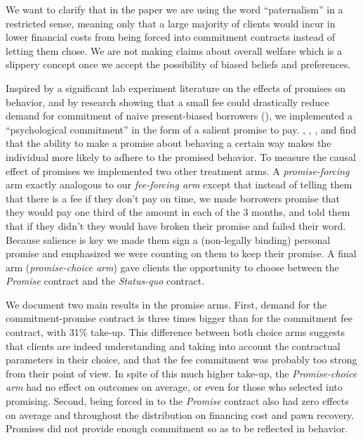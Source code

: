 \documentclass[oneside,11pt]{article}
\begin{document}
We want to clarify that in the paper we are using the word ``paternalism'' in a restricted sense, meaning only that a large majority of clients would incur in lower financial costs from being forced into commitment contracts instead of letting them chose. We are not making claims about overall welfare which is a slippery concept once we accept the possibility of biased beliefs and preferences.

Inspired by a significant lab experiment literature on the effects of promises on behavior, and by research showing that a small fee could drastically reduce demand for commitment of naive present-biased borrowers (\cite{Laibson2015}), we implemented a ``psychological commitment'' in the form of a salient promise to pay.  \cite{PromisesPartnerships}, \cite{FurtherPromises}, \cite{Vanberg}, and \cite{Ismayilov2017} find that the ability to make a promise about behaving a certain way makes the individual more likely to adhere to the promised behavior. %
To measure the causal effect of promises we implemented two other treatment arms. A \textit{promise-forcing} arm exactly analogous to our \textit{fee-forcing arm} except that instead of telling them that there is a fee if they don't pay on time, we made borrowers promise that they would pay one third of the amount in each of the 3 months, and told them that if they didn't they would have broken their promise and failed their word. Because salience is key we made them sign a (non-legally binding) personal promise and emphasized we were counting on them to keep their promise. A final arm (\textit{promise-choice arm}) gave clients the opportunity to choose between the \textit{Promise} contract and the \textit{Status-quo} contract.

We document two main results in the promise arms. First, demand for the commitment-promise contract is three times bigger than for the commitment fee contract, with 31\% take-up. This difference between both choice arms suggests that clients are indeed understanding and taking into account the contractual parameters in their choice, and that the fee commitment was probably too strong from their point of view. In spite of this much higher take-up, the \textit{Promise-choice arm} had no effect on outcomes on average, or even for those who selected into promising. Second, being forced in to the \textit{Promise} contract also had zero effects on average and throughout the distribution on financing cost and pawn recovery. %
Promises did not provide enough commitment so as to be reflected in behavior.
\end{document}
